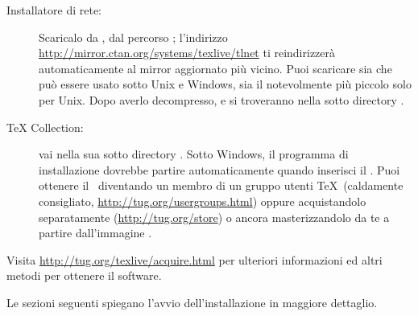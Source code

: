 \documentclass{article}
\begin{document}
\begin{description}
\item [Installatore di rete:] Scaricalo da \CTAN, dal percorso
; l'indirizzo
\url{http://mirror.ctan.org/systems/texlive/tlnet} ti reindirizzerà
automaticamente al mirror aggiornato più vicino. Puoi scaricare sia
 che può essere usato sotto Unix e Windows, sia
il notevolmente più piccolo  solo per Unix.
Dopo averlo decompresso,  e 
si troveranno nella sotto directory .

\item [\DVD{} \TeX{} Collection:] vai nella sua sotto directory
. Sotto Windows, il programma di installazione dovrebbe
partire automaticamente quando inserisci il \DVD. Puoi ottenere il \DVD\
diventando un membro di un gruppo utenti \TeX\ (caldamente consigliato,
\url{http://tug.org/usergroups.html}) oppure acquistandolo separatamente
(\url{http://tug.org/store}) o ancora masterizzandolo da te a partire
dall'immagine \ISO.

\end{description}

Visita \url{http://tug.org/texlive/acquire.html} per ulteriori
informazioni ed altri metodi per ottenere il software.

Le sezioni seguenti spiegano l'avvio dell'installazione in maggiore
dettaglio.
\end{document}
